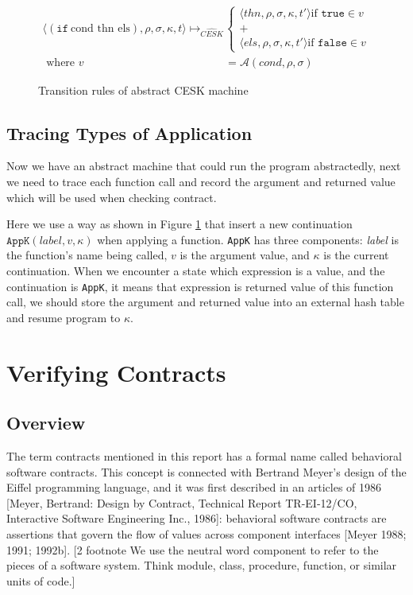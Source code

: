 \documentclass[paper=a4, fontsize=11pt]{scrartcl} %
\numberwithin{equation}{section} %
\numberwithin{figure}{section} %
\numberwithin{table}{section} %
\begin{document}
\begin{figure}[h!]
\begin{align*}
\langle (\texttt{if}~\text{cond thn els}), \rho, \sigma, \kappa, t \rangle \longmapsto_{\widehat{CESK}} &
\begin{cases}
\langle thn, \rho, \sigma, \kappa, t' \rangle \text{if } \texttt{true} \in v \\
+ \\
\langle els, \rho, \sigma, \kappa, t' \rangle \text{if } \texttt{false} \in v
\end{cases} \\
\text{ where } v & = \mathcal{A}(cond, \rho, \sigma)
\end{align*}
\caption{Transition rules of abstract CESK machine}
\label{fig:transabs}
\end{figure}

\subsection{Tracing Types of Application}

Now we have an abstract machine that could run the program abstractedly, next we need to trace each function call and record the argument and returned value which will be used when checking contract. 

Here we use a way as shown in Figure \ref{fig:transabs} that insert a new continuation $\texttt{AppK}(label, v, \kappa)$ when applying a function. \texttt{AppK} has three components: \textit{label} is the function's name being called, $v$ is the argument value, and $\kappa$ is the current continuation. When we encounter a state which expression is a value, and the continuation is \texttt{AppK}, it means that expression is returned value of this function call, we should store the argument and returned value into an external hash table and resume program to $\kappa$.



\section{Verifying Contracts}

\subsection{Overview}
The term contracts mentioned in this report has a formal name called behavioral software contracts. This concept is connected with Bertrand Meyer's design of the Eiffel programming language, and it was first described in an articles of 1986 [Meyer, Bertrand: Design by Contract, Technical Report TR-EI-12/CO, Interactive Software Engineering Inc., 1986]: behavioral software contracts are assertions that govern the flow of values across component interfaces [Meyer 1988; 1991; 1992b].
[2 footnote We use the neutral word component to refer to the pieces of a software system. Think module, class, procedure, function, or similar units of code.]
\end{document}
